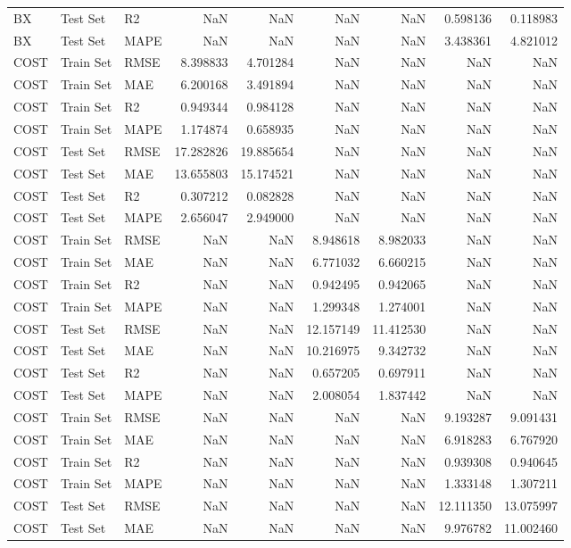 \begin{tabular}{lllrrrrrr}
BX & Test Set & R2 & NaN & NaN & NaN & NaN & 0.598136 & 0.118983 \\
BX & Test Set & MAPE & NaN & NaN & NaN & NaN & 3.438361 & 4.821012 \\
COST & Train Set & RMSE & 8.398833 & 4.701284 & NaN & NaN & NaN & NaN \\
COST & Train Set & MAE & 6.200168 & 3.491894 & NaN & NaN & NaN & NaN \\
COST & Train Set & R2 & 0.949344 & 0.984128 & NaN & NaN & NaN & NaN \\
COST & Train Set & MAPE & 1.174874 & 0.658935 & NaN & NaN & NaN & NaN \\
COST & Test Set & RMSE & 17.282826 & 19.885654 & NaN & NaN & NaN & NaN \\
COST & Test Set & MAE & 13.655803 & 15.174521 & NaN & NaN & NaN & NaN \\
COST & Test Set & R2 & 0.307212 & 0.082828 & NaN & NaN & NaN & NaN \\
COST & Test Set & MAPE & 2.656047 & 2.949000 & NaN & NaN & NaN & NaN \\
COST & Train Set & RMSE & NaN & NaN & 8.948618 & 8.982033 & NaN & NaN \\
COST & Train Set & MAE & NaN & NaN & 6.771032 & 6.660215 & NaN & NaN \\
COST & Train Set & R2 & NaN & NaN & 0.942495 & 0.942065 & NaN & NaN \\
COST & Train Set & MAPE & NaN & NaN & 1.299348 & 1.274001 & NaN & NaN \\
COST & Test Set & RMSE & NaN & NaN & 12.157149 & 11.412530 & NaN & NaN \\
COST & Test Set & MAE & NaN & NaN & 10.216975 & 9.342732 & NaN & NaN \\
COST & Test Set & R2 & NaN & NaN & 0.657205 & 0.697911 & NaN & NaN \\
COST & Test Set & MAPE & NaN & NaN & 2.008054 & 1.837442 & NaN & NaN \\
COST & Train Set & RMSE & NaN & NaN & NaN & NaN & 9.193287 & 9.091431 \\
COST & Train Set & MAE & NaN & NaN & NaN & NaN & 6.918283 & 6.767920 \\
COST & Train Set & R2 & NaN & NaN & NaN & NaN & 0.939308 & 0.940645 \\
COST & Train Set & MAPE & NaN & NaN & NaN & NaN & 1.333148 & 1.307211 \\
COST & Test Set & RMSE & NaN & NaN & NaN & NaN & 12.111350 & 13.075997 \\
COST & Test Set & MAE & NaN & NaN & NaN & NaN & 9.976782 & 11.002460 \\

\end{tabular}

